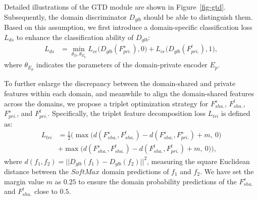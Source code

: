 \documentclass[journal]{IEEEtran}
\begin{document}
{} Detailed illustrations of the GTD module are shown in Figure~\ref{fig-gtd}. {} Subsequently, the domain discriminator $D_{glb}$ should be able to distinguish them. Based on this assumption, we first introduce a domain-specific classification loss $L_{ds}$ to enhance the classification ability of $D_{glb}$:
\begin{equation}
\begin{aligned}
L_{ds} & =  \min\limits_{\theta_{D}, \theta_{E_{p}}} L_{ce}\Big(D_{glb}(F_{pri.}^{s}), 0\Big) + L_{ce}\Big(D_{glb}(F_{pri.}^{t}), 1\Big),
\label{equ-loss-ds}
\end{aligned}
\end{equation}
where $\theta_{E_{p}}$ indicates the parameters of the domain-private encoder $E_{p}$.


To further enlarge the discrepancy between the domain-shared and private features within each domain, and meanwhile to align the domain-shared features across the domains, we propose a triplet optimization strategy for $F_{sha.}^{s}$, $F_{sha.}^{t}$, $F_{pri.}^{s}$, and $F_{pri.}^{t}$. Specifically, the triplet feature decomposition loss $L_{tri}$ is defined as:
\begin{equation}
\begin{aligned}
L_{tri} & =\frac{1}{2}\bigg(\max\Big(d(F_{sha.}^{s}, F_{sha.}^{t}) - d(F_{sha.}^{s}, F_{pri.}^{s}) + m,~0\Big) \\
& + \max\Big(d(F_{sha.}^{s}, F_{sha.}^{t}) - d(F_{sha.}^{t}, F_{pri.}^{t}) + m,~0\Big)\bigg),
\label{equ-loss-tri}
\end{aligned}
\end{equation}
where $d(f_{1}, f_{2}) = ||D_{glb}(f_{1}) - D_{glb}(f_{2})||^{2}$, measuring the square Euclidean distance between the $SoftMax$ domain predictions of $f_{1}$ and $f_{2}$. We have set the margin value $m$ as $0.25$ to ensure the domain probability predictions of the $F_{sha.}^{s}$ and $F_{sha.}^{t}$ close to $0.5$. {}
\end{document}
